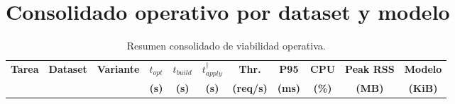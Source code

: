 \documentclass[12pt,oneside]{report}
\begin{document}
\section{Consolidado operativo por dataset y modelo}
\begin{table}[H]
\centering
\caption{Resumen consolidado de viabilidad operativa.}
\label{tab:waf-consolidado}
\scriptsize
\renewcommand{\arraystretch}{1.10}
\begin{adjustbox}{max width=\textwidth}
\begin{tabular}{lllcccccccc}
\toprule
\textbf{Tarea} & \textbf{Dataset} & \textbf{Variante} & $t_{opt}$ & $t_{build}$ & $t_{apply}^{\dagger}$ & \textbf{Thr.} & \textbf{P95} & \textbf{CPU} & \textbf{Peak RSS} & \textbf{Modelo} \\
 &  &  & \textbf{(s)} & \textbf{(s)} & \textbf{(s)} & \textbf{(req/s)} & \textbf{(ms)} & \textbf{(\%)} & \textbf{(MB)} & \textbf{(KiB)} \\
\midrule

\end{tabular}
\end{adjustbox}
\end{table}
\end{document}
